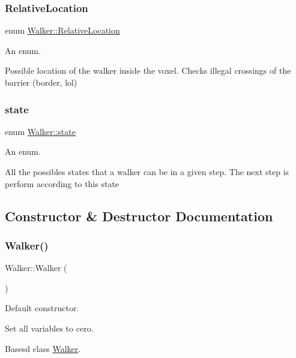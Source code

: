 \subsubsection{\texorpdfstring{Relative\+Location}{RelativeLocation}}
{\footnotesize\ttfamily enum \hyperlink{class_walker_a24246136a10754791b05cb570dbb8417}{Walker\+::\+Relative\+Location}}



An enum. 

Possible location of the walker inside the voxel. Checks illegal crossings of the barrier (border, lol) \mbox{\label{class_walker_afcad3f5c11d0bd045de22fb0347dc44c}} 
\subsubsection{\texorpdfstring{state}{state}}
{\footnotesize\ttfamily enum \hyperlink{class_walker_afcad3f5c11d0bd045de22fb0347dc44c}{Walker\+::state}}



An enum. 

All the possibles states that a walker can be in a given step. The next step is perform according to this state 

\subsection{Constructor \& Destructor Documentation}
\mbox{\label{class_walker_acc0931305bedcf81ff621c31cdf2a92c}} 
\subsubsection{\texorpdfstring{Walker()}{Walker()}\hspace{0.1cm}{\footnotesize\ttfamily [1/2]}}
{\footnotesize\ttfamily Walker\+::\+Walker (\begin{DoxyParamCaption}{ }\end{DoxyParamCaption})}



Default constructor. 

Set all variables to cero.

Basesd class \hyperlink{class_walker}{Walker}. \mbox{\label{class_walker_a562c14b600628c18ac689464bd0f7e35}} 
